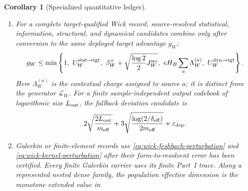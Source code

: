 \documentclass[11pt]{article}
\numberwithin{section}{part}
\theoremstyle{plain}
\newtheorem{corollary}[corollary]{Corollary}
\theoremstyle{definition}
\theoremstyle{remark}
\begin{document}
\begin{corollary}[Specialized quantitative ledger]
\begin{enumerate}[label=\textup{(\roman*)}]
\begin{align}
\end{align}
The critic and actor objectives are
\eqref{eq:wick-rl-critic-loss} and
\eqref{eq:wick-rl-gibbs-policy}.  Define the extended coordinates
\(\varepsilon_M\) as the same-norm model defect and \(\varepsilon_B\) as the
learned Bellman residual.  On the Part~I discounted Bellman/contraction cell,
the Bellman candidate is
\begin{align}
 \|V^*-v\|_\infty
 &\le\frac{\varepsilon_B+\varepsilon_M}{1-\gamma},
 \label{eq:wick-bellman-value}\\
 \|V^*-V^{\widehat\pi_v}\|_\infty
 &\le\frac{2\gamma(\varepsilon_B+\varepsilon_M)}{(1-\gamma)^2}
 +\frac{2\varepsilon_M}{1-\gamma}.
 \label{eq:wick-bellman-policy}
\end{align}
Here \(0<\gamma<1\) is the declared discount or contraction modulus.  The
distance from \(J_D\) to the legal policy-current family is the irreducible
authority/action gap; it cannot be removed by additional value samples.
The complementary control-status cell assigns these Bellman candidates
\(+\infty\) and retains its typed control defect.
\item For a complete target-qualified Wick record, source-resolved
statistical, information, structural, and dynamical candidates combine only
after conversion to the same deployed target advantage \(g_W\):
\begin{equation}
 \label{eq:wick-source-resolved-target-minimum}
 g_W\le\min\left\{
 1,\ U_W^{\rm stat\to tgt},\
 \beta_W^++\sqrt{\frac{\log2}{2}J_W^{\rm src}},\
 eH_B\sum_a\Lambda_W^{(a)},\
 U_W^{\rm dyn\to tgt}
 \right\}.
\end{equation}
Here \(\Lambda_W^{(a)}\) is the contextual charge assigned to source
\(a\); it is distinct from the generator \(\mathcal L_W\).
For a finite sample-independent output codebook of logarithmic size
\(L_{\rm out}\), the fallback deviation candidate is
\begin{equation}
 \label{eq:wick-finite-description-radius}
 2\sqrt{\frac{2L_{\rm out}}{m_{\rm eff}}}
 +3\sqrt{\frac{\log(2/\delta_{\rm eff})}{2m_{\rm eff}}}
 +\varepsilon_{\rm dep}.
\end{equation}
\item Galerkin or finite-element records use
\eqref{eq:wick-feshbach-perturbation} and
\eqref{eq:wick-kernel-perturbation} after their form-to-resolvent error has
been certified.  Every finite Galerkin carrier uses its finite Part~I trace.
Along a represented nested dense family, the population effective dimension
is the monotone extended value in

\end{enumerate}
\end{corollary}
\end{document}
